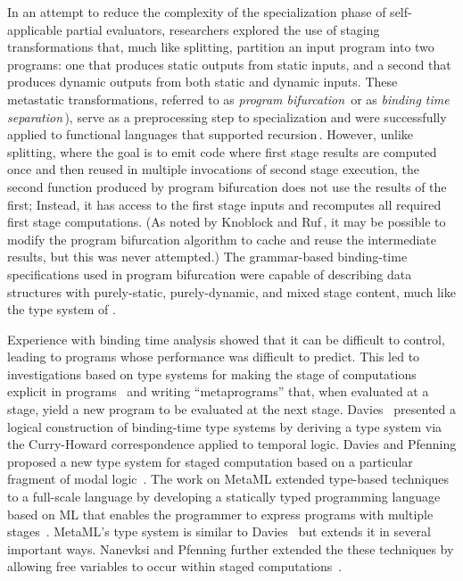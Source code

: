 In an attempt to reduce the complexity of the specialization phase of
self-applicable partial evaluators, researchers explored the use of
staging transformations that, much like splitting, partition an input
program into two programs: one that produces static outputs from
static inputs, and a second that produces dynamic outputs from both
static and dynamic inputs.  These metastatic transformations, referred
to as \emph{program bifurcation}\,\cite{DeNiel91} or as \emph{binding
  time separation}\,\cite{Mogensen89a}), serve as a preprocessing step
to specialization and were successfully applied to functional
languages that supported recursion\,\cite{DeNiel91}. However, unlike
splitting, where the goal is to emit code where first stage results
are computed once and then reused in multiple invocations of second
stage execution, the second function produced by program bifurcation
does not use the results of the first; Instead,
it has access to the first stage inputs and recomputes all required
first stage computations. (As noted by Knoblock and
Ruf\,\cite{knoblock96}, it may be possible to modify the program
bifurcation algorithm to cache and reuse the intermediate results, but
this was never attempted.) The grammar-based binding-time
specifications used in program bifurcation were capable of describing
data structures with purely-static, purely-dynamic, and mixed stage
content, much like the type system of \lang.

Experience with binding time analysis showed that it can be difficult
to control, leading to programs whose performance was difficult to
predict. This led to investigations based on type systems for making
the stage of computations explicit in
programs~\cite{GJ91-lambda,NN92-twolevel} and writing ``metaprograms''
that, when evaluated at a stage, yield a new program to be evaluated
at the next stage.  Davies~\cite{davies96} presented a logical
construction of binding-time type systems by deriving a type system
via the Curry-Howard correspondence applied to temporal logic.  Davies
and Pfenning proposed a new type system for staged computation based
on a particular fragment of modal logic~\cite{DP01-modal}. The work on
MetaML extended type-based techniques to a full-scale language by
developing a statically typed programming language based on ML that
enables the programmer to express programs with multiple
stages~\cite{Taha97,taha-thesis-99}.  MetaML's type system is similar
to Davies~\cite{davies96} but extends it in several important ways.
Nanevksi and Pfenning further extended the these techniques by
allowing free variables to occur within staged
computations~\cite{NP05-nn}.

